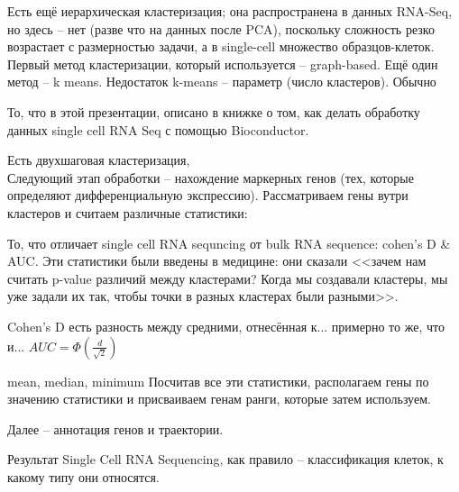 \documentclass[main.tex]{subfiles}
\begin{document}
Есть ещё иерархическая кластеризация; она распространена в данных RNA-Seq, но здесь -- нет (разве что на данных после PCA), поскольку сложность резко возрастает с размерностью задачи, а в single-cell множество образцов-клеток.
Первый метод кластеризации, который используется -- graph-based.
Ещё один метод -- k means. Недостаток k-means -- параметр (число кластеров). Обычно

\begin{leftbar}
	То, что в этой презентации, описано в книжке о том, как делать обработку данных single cell RNA Seq  с помощью Bioconductor.
\end{leftbar}

Есть двухшаговая кластеризация, \\

Следующий этап обработки -- нахождение маркерных генов (тех, которые определяют дифференциальную экспрессию).
Рассматриваем гены вутри кластеров и считаем различные статистики:

То, что отличает single cell RNA sequncing от bulk RNA sequence: cohen's D \& AUC.
Эти статистики были введены в медицине: они сказали <<зачем нам считать p-value различий между кластерами? Когда мы создавали кластеры, мы уже задали их так, чтобы точки в разных кластерах были разными>>.

Cohen's D есть разность между средними, отнесённая к... примерно то же, что и...
$ AUC = \Phi\left( \frac{d}{\sqrt{2}} \right) $

mean, median, minimum
Посчитав все эти статистики, располагаем гены по значению статистики и присваиваем генам ранги, которые затем используем.

Далее -- аннотация генов и траектории.

Результат Single Cell RNA Sequencing, как правило -- классификация клеток, к какому типу они относятся.
\end{document}
